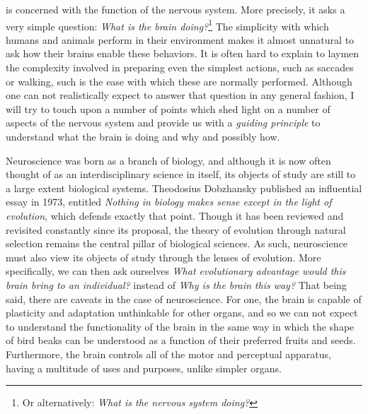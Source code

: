  is concerned with the function of the nervous system. More precisely, it asks a very simple question: {\em What is the brain doing?}\footnote{ Or alternatively: {\em What is the nervous system doing?}} The simplicity with which humans and animals perform in their environment makes it almost unnatural to ask how their brains enable these behaviors. It is often hard to explain to laymen the complexity involved in preparing even the simplest actions, such as saccades or walking, such is the ease with which these are normally performed. Although one can not realistically expect to answer that question in any general fashion, I will try to touch upon a number of points which shed light on a number of aspects of the nervous system and provide us with a {\em guiding principle} to understand what the brain is doing and why and possibly how.\par
Neuroscience was born as a branch of biology, and although it is now often thought of as  an interdisciplinary science in itself, its objects of study are still to a large extent biological systems. Theodosius Dobzhansky published an influential essay in 1973, entitled {\em Nothing in biology makes sense except in the light of evolution}\cite{Dobzhansky1973}, which defends exactly that point. Though it has been reviewed and revisited constantly since its proposal, the theory of evolution through natural selection remains the central pillar of biological sciences. As such, neuroscience must also view its objects of study through the lenses of evolution. More specifically, we can then ask ourselves {\em What evolutionary advantage would this brain bring to an individual?} instead of {\em Why is the brain this way?} That being said,  there are caveats in the case of neuroscience. For one, the brain is capable of plasticity and adaptation unthinkable for other organs, and so we can not expect to understand the functionality of the brain in the same way in which the shape of bird beaks can be understood as a function of their preferred fruits and seeds. Furthermore, the brain controls all of the motor and perceptual apparatus, having a multitude of uses and purposes, unlike simpler organs.\par
